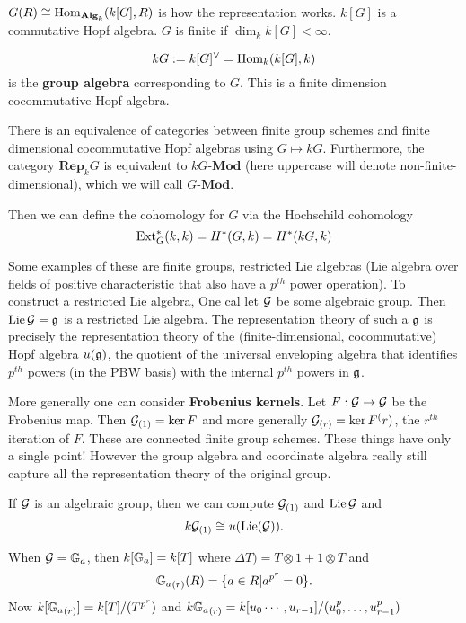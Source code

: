 \documentclass[12pt]{article}
\newcommand{\Ga}{\bbG_a}
\begin{document}
\begin{rmk}
	$G(R)\cong \operatorname{Hom}_{\mathbf{Alg}_k}(k[G],R)$ is how the representation works. $k[G]$ is a commutative Hopf algebra. $G$ is finite if $\dim_kk[G]<\infty$.
\end{rmk}

\begin{defn}
	\[kG:=k[G]^\vee=\operatorname{Hom}_k(k[G],k)\]
	is the \textbf{group algebra} corresponding to $G$. This is a finite dimension cocommutative Hopf algebra.
\end{defn}

\begin{rmk}
	There is an equivalence of categories between finite group schemes and finite dimensional cocommutative Hopf algebras using $G\mapsto kG$. 
	Furthermore, the category $\mathbf{Rep}_kG$ is equivalent to $kG$-$\mathbf{Mod}$ (here uppercase will denote non-finite-dimensional), which we will call $G$-$\mathbf{Mod}$.
\end{rmk}

Then we can define the cohomology for $G$ via the Hochschild cohomology
\[\operatorname{Ext}_G^\ast(k,k)=H^\ast(G,k)=H^\ast(kG,k)\]

Some examples of these are finite groups, restricted Lie algebras (Lie algebra over fields of positive characteristic that also have a $p^{th}$ power operation). 
To construct a restricted Lie algebra, One cal let $\mathcal{G}$ be some algebraic group. Then $\operatorname{Lie}\mathcal{G}=\mathfrak{g}$ is a restricted Lie algebra.
The representation theory of such a $\mathfrak{g}$ is precisely the representation theory of the (finite-dimensional, cocommutative) Hopf algebra $u(\mathfrak{g})$,
the quotient of the universal enveloping algebra that identifies $p^{th}$ powers (in the PBW basis) with the internal $p^{th}$ powers in $\mathfrak{g}$.

More generally one can consider \textbf{Frobenius kernels}. Let $F:\mathcal{G}\to\mathcal{G}$ be the Frobenius map. Then 
$\mathcal{G}_{(1)}=\ker F$ and more generally $\mathcal{G}_{(r)}=\ker F^(r)$, the $r^{th}$ iteration of $F$. These are connected
finite group schemes. These things have only a single point! However the group algebra and coordinate algebra really still capture 
all the representation theory of the original group.

If $\mathcal{G}$ is an algebraic group, then we can compute $\mathcal{G}_{(1)}$ and $\operatorname{Lie}\mathcal{G}$ and 
\[k\mathcal{G}_{(1)}\cong u(\operatorname{Lie}(\mathcal{G})).\]

When $\calG=\Ga$, then $k[\Ga]=k[T]$ where $\Delta T)=T\otimes 1+1\otimes T$ and 
\[{\Ga}_{(r)}(R)=\{a\in R|a^{p^r}=0\}.\]
Now $k[{\Ga}_{(r)}]=k[T]/(T^{p^r})$ and $k{\Ga}_{(r)}=k[u_0\cdots,u_{r-1}]/(u_0^p,\dots,u_{r-1}^p)$
\end{document}
